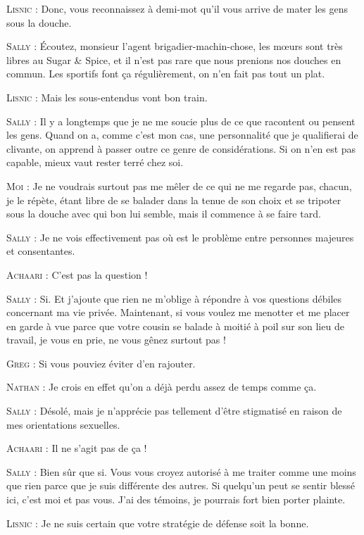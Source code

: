 \begin{dialogue}
\textsc{Lisnic} : Donc, vous reconnaissez à demi-mot qu’il vous arrive de mater les gens sous la douche.

\textsc{Sally} : Écoutez, monsieur l’agent brigadier-machin-chose, les mœurs sont très libres au Sugar \& Spice, et il n’est pas rare que nous prenions nos douches en commun. Les sportifs font ça régulièrement, on n’en fait pas tout un plat.

\textsc{Lisnic} : Mais les sous-entendus vont bon train.

\textsc{Sally} : Il y a longtemps que je ne me soucie plus de ce que racontent ou pensent les gens. Quand on a, comme c’est mon cas, une personnalité que je qualifierai de clivante, on apprend à passer outre ce genre de considérations. Si on n’en est pas capable, mieux vaut rester terré chez soi.

\textsc{Moi} : Je ne voudrais surtout pas me mêler de ce qui ne me regarde pas, chacun, je le répète, étant libre de se balader dans la tenue de son choix et se tripoter sous la douche avec qui bon lui semble, mais il commence à se faire tard.

\textsc{Sally} : Je ne vois effectivement pas où est le problème entre personnes majeures et consentantes.

\textsc{Achaari} : C’est pas la question !

\textsc{Sally} : Si. Et j’ajoute que rien ne m’oblige à répondre à vos questions débiles concernant ma vie privée. Maintenant, si vous voulez me menotter et me placer en garde à vue parce que votre cousin se balade à moitié à poil sur son lieu de travail, je vous en prie, ne vous gênez surtout pas !

\textsc{Greg} : Si vous pouviez éviter d’en rajouter.

\textsc{Nathan} : Je crois en effet qu’on a déjà perdu assez de temps comme ça.

\textsc{Sally} : Désolé, mais je n’apprécie pas tellement d’être stigmatisé en raison de mes orientations sexuelles.

\textsc{Achaari} : Il ne s’agit pas de ça !

\textsc{Sally} : Bien sûr que si. Vous vous croyez autorisé à me traiter comme une moins que rien parce que je suis différente des autres. Si quelqu’un peut se sentir blessé ici, c’est moi et pas vous. J’ai des témoins, je pourrais fort bien porter plainte.

\textsc{Lisnic} : Je ne suis certain que votre stratégie de défense soit la bonne.


\end{dialogue}
